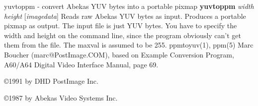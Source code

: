 %

\newpage
%

yuvtoppm - convert Abekas YUV bytes into a portable pixmap
{\bf yuvtoppm}
{\it width height}
{\rm [}{\it imagedata}{\rm ]}
Reads raw Abekas YUV bytes as input.
Produces a portable pixmap as output.
The input file is just YUV bytes.
You have to specify the width and height on the command line,
since the program obviously can't get them from the file.
The maxval is assumed to be 255.
ppmtoyuv(1), ppm(5)
Marc Boucher (marc@PostImage.COM),
based on Example Conversion Program, A60/A64 Digital Video Interface
Manual, page 69.
\par
\copyright 1991 by DHD PostImage Inc.
\par
\copyright 1987 by Abekas Video Systems Inc.
%
 
%

\newpage
%

